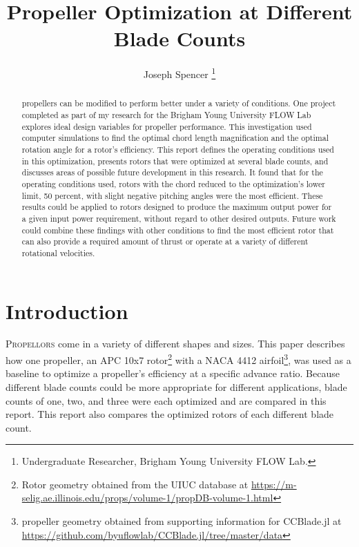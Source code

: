 \documentclass[journal ]{new-aiaa}
\title{Propeller Optimization at Different Blade Counts}
\author{Joseph Spencer \footnote{Undergraduate Researcher, Brigham Young University FLOW Lab.}}
\affil{Brigham Young University, Provo, Utah, 84601}
\begin{document}
\maketitle

\begin{abstract}

propellers can be modified to perform better under a variety of conditions. One project completed as part of my research for the Brigham Young University FLOW Lab explores ideal design variables for propeller performance. This investigation used computer simulations to find the optimal chord length magnification and the optimal rotation angle for a rotor's efficiency. This report defines the operating conditions used in this optimization, presents rotors that were optimized at several blade counts, and discusses areas of possible future development in this research. It found that for the operating conditions used, rotors with the chord reduced to the optimization's lower limit, 50 percent, with slight negative pitching angles were the most efficient. These results could be applied to rotors designed to produce the maximum output power for a given input power requirement, without regard to other desired outputs. Future work could combine these findings with other conditions to find the most efficient rotor that can also provide a required amount of thrust or operate at a variety of different rotational velocities.

\end{abstract}


\section{Introduction}

\lettrine{P}{ropellors} come in a variety of different shapes and sizes. This paper describes how one propeller, an APC 10x7 rotor\footnote{Rotor geometry obtained from the UIUC database at \url{https://m-selig.ae.illinois.edu/props/volume-1/propDB-volume-1.html}} with a NACA 4412 airfoil\footnote{propeller geometry obtained from supporting information for CCBlade.jl at \url{https://github.com/byuflowlab/CCBlade.jl/tree/master/data}}, was used as a baseline to optimize a propeller's efficiency at a specific advance ratio. Because different blade counts could be more appropriate for different applications, blade counts of one, two, and three were each optimized and are compared in this report. This report also compares the optimized rotors of each different blade count.
\end{document}
